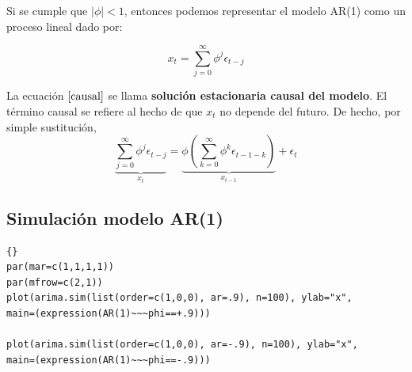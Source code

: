 
Si se cumple que $|\phi|< 1$, entonces podemos representar el modelo AR(1) como un proceso lineal dado por:

\begin{equation}
x_t = \sum_{j=0}^{\infty} \phi^j \epsilon_{t-j}
\label{causal}
\end{equation}

La ecuaci\'on $\eqref{causal}$ se llama \textbf{soluci\'on estacionaria causal del modelo}. El t\'ermino causal se refiere al hecho de que $x_t$ no depende del futuro. De hecho, por simple sustituci\'on,\\
\begin{equation}
\underbrace{\sum_{j=0}^{\infty} \phi^j\epsilon_{t-j}}_{x_t} = \underbrace{\phi\left(\sum_{k=0}^{\infty} \phi^k\epsilon_{t-1-k}\right)}_{x_{t-1}}+\epsilon_t
\end{equation}


\subsection{Simulaci\'on modelo AR(1)}

\begin{lstlisting}[title={‘Código R: Simulaci\'on modelo AR(1) ’},basicstyle=\ttfamily]{}
par(mar=c(1,1,1,1))
par(mfrow=c(2,1))
plot(arima.sim(list(order=c(1,0,0), ar=.9), n=100), ylab="x",
main=(expression(AR(1)~~~phi==+.9)))

plot(arima.sim(list(order=c(1,0,0), ar=-.9), n=100), ylab="x",
main=(expression(AR(1)~~~phi==-.9)))
\end{lstlisting}

